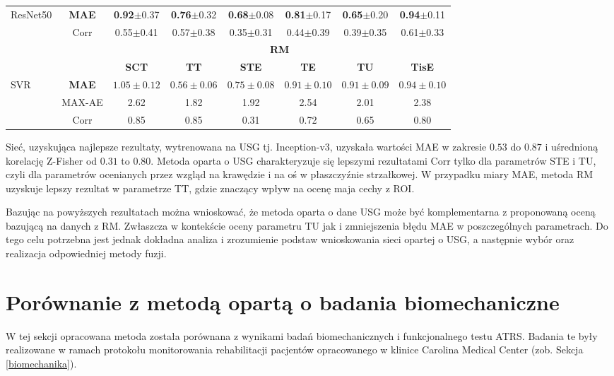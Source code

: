 \begin{table}[h]
\begin{tabular}{lc||c|c|c|c|c|c}
		ResNet50 & \textbf{MAE} & \textbf{0.92}$\pm$0.37 & \textbf{0.76}$\pm$0.32 & \textbf{0.68}$\pm$0.08 & \textbf{0.81}$\pm$0.17 & \textbf{0.65}$\pm$0.20 & \textbf{0.94}$\pm$0.11 \\
		& Corr & 0.55$\pm$0.41 & 0.57$\pm$0.38 & 0.35$\pm$0.31 & 0.44$\pm$0.39 & 0.39$\pm$0.35 & 0.61$\pm$0.33 \\ \hline \hline
				& & \multicolumn{6}{c}{\normalsize{\textbf{RM}}} \\
		& & \textbf{SCT} & \textbf{TT} & \textbf{STE} & \textbf{TE} & \textbf{TU} & \textbf{TisE}\\ \hline
		SVR & \textbf{MAE} & $1.05\pm0.12$ & $0.56\pm0.06$ & $0.75\pm0.08$ & $0.91\pm0.10$ & $0.91\pm0.09$ & $0.94\pm0.10$\\
		& MAX-AE & 2.62 & 1.82 & 1.92 & 2.54 & 2.01 & 2.38 \\
		& Corr   & 0.85 & 0.85 & 0.31 & 0.72 & 0.65 & 0.80 \\
		\hline \hline
	\end{tabular}
\end{table}

Sieć, uzyskująca najlepsze rezultaty, wytrenowana na USG tj. Inception-v3, uzyskała wartości MAE w zakresie $0.53$ do $0.87$ i uśrednioną korelację Z-Fisher od $0.31$ to $0.80$.
Metoda oparta o USG charakteryzuje się lepszymi rezultatami Corr tylko dla parametrów STE i TU, czyli dla parametrów ocenianych przez wzgląd na krawędzie i na oś w płaszczyźnie strzałkowej. W przypadku miary MAE, metoda RM uzyskuje lepszy rezultat w parametrze TT, gdzie znaczący wpływ na ocenę maja cechy z ROI.

Bazując na powyższych rezultatach można wnioskować, że metoda oparta o dane USG może być komplementarna z proponowaną oceną bazującą na danych z RM. Zwłaszcza w kontekście oceny parametru TU jak i zmniejszenia błędu MAE w poszczególnych parametrach. Do tego celu potrzebna jest jednak dokładna analiza i zrozumienie podstaw wnioskowania sieci opartej o USG, a następnie wybór oraz realizacja odpowiedniej metody fuzji.

\section{Porównanie z metodą opartą o badania biomechaniczne}

W tej sekcji opracowana metoda została porównana z wynikami badań biomechanicznych i funkcjonalnego testu ATRS. Badania te były realizowane w ramach protokołu monitorowania rehabilitacji pacjentów opracowanego w klinice Carolina Medical Center (zob. Sekcja \ref{biomechanika}). 

